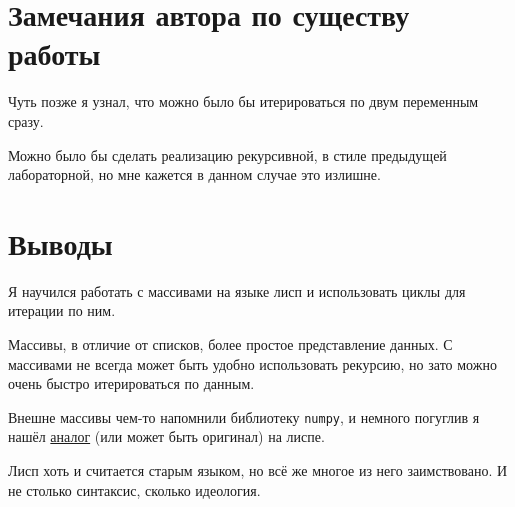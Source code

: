 \documentclass[12pt]{article}
\begin{document}
\section{Замечания автора по существу работы}

Чуть позже я узнал, что можно было бы итерироваться по двум переменным сразу.

Можно было бы сделать реализацию рекурсивной, в стиле предыдущей лабораторной,
но мне кажется в данном случае это излишне.

\section{Выводы}

\noindent Я научился работать с массивами на языке лисп и использовать циклы для итерации по ним.

Массивы, в отличие от списков, более простое представление данных. С массивами не всегда может быть
удобно использовать рекурсию, но зато можно очень быстро итерироваться по данным.

Внешне массивы чем-то напомнили библиотеку {\tt numpy}, и немного погуглив я нашёл
\href{https://github.com/tpapp/array-operations}{аналог} (или может быть оригинал) на лиспе.

Лисп хоть и считается старым языком, но всё же многое из него заимствовано. И не столько синтаксис,
сколько идеология.
\end{document}

